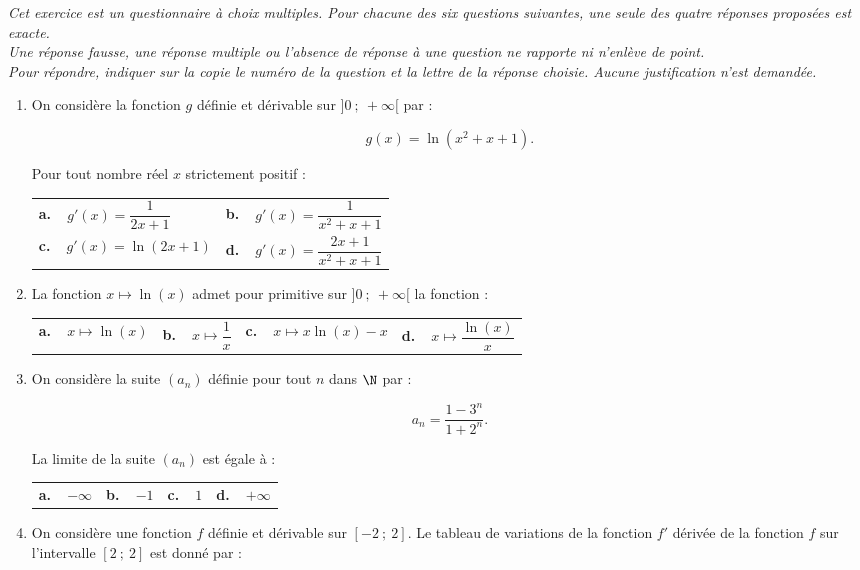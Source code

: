 \medskip

\emph{Cet exercice est un questionnaire à choix multiples. Pour chacune des six questions suivantes, une seule des quatre réponses proposées est exacte.\\
Une réponse fausse, une réponse multiple ou l'absence de réponse à une question ne rapporte ni n'enlève de point.\\
Pour répondre, indiquer sur la copie le numéro de la question et la lettre de la réponse choisie. Aucune justification n'est demandée.}

\medskip

\begin{enumerate}
\item On considère  la fonction $g$ définie et dérivable sur $]0~;~+ \infty[$ par :

\[g(x) = \ln \left(x^2 + x + 1\right).\]

Pour tout nombre réel $x$ strictement positif :

\begin{center}
\begin{tabularx}{\linewidth}{X X}
\textbf{a.~~}$g'(x) = \dfrac{1}{2x + 1}$&\textbf{b.~~}$g'(x) = \dfrac{1}{x^2 + x + 1}$\\[8pt]
\textbf{c.~~}$g'(x) = \ln (2x + 1)$&\textbf{d.~~}$g'(x) = \dfrac{2x + 1}{x^2 + x + 1}$
\end{tabularx}
\end{center}
\item La fonction $x \longmapsto \ln (x)$ admet pour primitive sur $]0~;~+ \infty[$ la fonction :

\begin{center}
\begin{tabularx}{\linewidth}{*{4}{X} }
\textbf{a.~~}$x \longmapsto \ln (x)$&\textbf{b.~~}$x \longmapsto \dfrac{1}{x}$&\textbf{c.~~}$x \longmapsto x \ln (x) - x$&\textbf{d.~~}$x \longmapsto \dfrac{\ln (x)}{x}$
\end{tabularx}
\end{center}
\item On considère la suite $\left(a_n\right)$ définie  pour tout $n$ dans $\N$ par :

\[a_n = \dfrac{1 - 3^n}{1 + 2^n}.\]

La limite de la suite $\left(a_n\right)$ est égale à :

\begin{center}
\begin{tabularx}{\linewidth}{*{4}{X} }
\textbf{a.~~}$- \infty$&\textbf{b.~~}$- 1$&\textbf{c.~~}$1$&\textbf{d.~~}$+ \infty$
\end{tabularx}
\end{center}
\item 
On considère une fonction $f$ définie et dérivable sur $[-2~;~2]$. Le tableau de variations de la fonction $f'$ dérivée de la fonction $f$ sur l'intervalle $[2~;~2]$ est donné par :


\end{enumerate}
